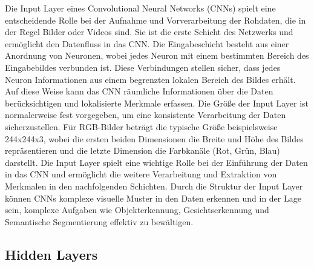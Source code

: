 Die Input Layer eines Convolutional Neural Networks (CNNs) spielt eine entscheidende Rolle bei der Aufnahme und Vorverarbeitung der Rohdaten, die in der Regel Bilder oder Videos sind. 
Sie ist die erste Schicht des Netzwerks und ermöglicht den Datenfluss in das CNN.
Die Eingabeschicht besteht aus einer Anordnung von Neuronen, wobei jedes Neuron mit einem bestimmten Bereich des Eingabebildes verbunden ist. 
Diese Verbindungen stellen sicher, dass jedes Neuron Informationen aus einem begrenzten lokalen Bereich des Bildes erhält. Auf diese Weise kann das CNN räumliche Informationen über die Daten berücksichtigen und lokalisierte Merkmale erfassen.
Die Größe der Input Layer ist normalerweise fest vorgegeben, um eine konsistente Verarbeitung der Daten sicherzustellen. 
Für RGB-Bilder beträgt die typische Größe beispielsweise 244x244x3, wobei die ersten beiden Dimensionen die Breite und Höhe des Bildes repräsentieren und die letzte Dimension die Farbkanäle (Rot, Grün, Blau) darstellt.
Die Input Layer spielt eine wichtige Rolle bei der Einführung der Daten in das CNN und ermöglicht die weitere Verarbeitung und Extraktion von Merkmalen in den nachfolgenden Schichten. 
Durch die Struktur der Input Layer können CNNs komplexe visuelle Muster in den Daten erkennen und in der Lage sein, komplexe Aufgaben wie Objekterkennung, Gesichtserkennung und Semantische Segmentierung effektiv zu bewältigen.


\subsection{Hidden Layers}


